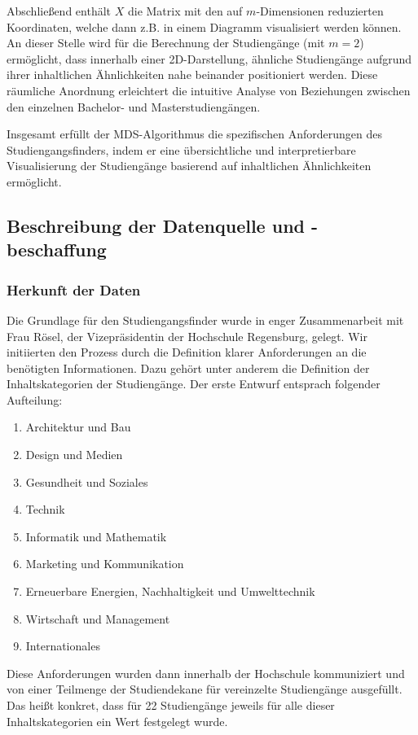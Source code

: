 Abschließend enthält $ X $ die Matrix mit den auf $ m $-Dimensionen reduzierten
Koordinaten, welche dann z.B. in einem Diagramm visualisiert werden können.
An dieser Stelle wird für die Berechnung der Studiengänge (mit $ m = 2 $)
ermöglicht, dass innerhalb einer 2D-Darstellung, ähnliche Studiengänge aufgrund
ihrer inhaltlichen Ähnlichkeiten nahe beinander positioniert werden. Diese
räumliche Anordnung erleichtert die intuitive Analyse von Beziehungen zwischen
den einzelnen Bachelor- und Masterstudiengängen.

Insgesamt erfüllt der MDS-Algorithmus die spezifischen Anforderungen des
Studiengangsfinders, indem er eine übersichtliche und interpretierbare
Visualisierung der Studiengänge basierend auf inhaltlichen Ähnlichkeiten
ermöglicht.

\subsection{Beschreibung der Datenquelle und -beschaffung}
\subsubsection{Herkunft der Daten}\label{sec:herkunft-der-daten}
Die Grundlage für den Studiengangsfinder wurde in enger Zusammenarbeit mit Frau
Rösel, der Vizepräsidentin der Hochschule Regensburg, gelegt. Wir initiierten
den Prozess durch die Definition klarer Anforderungen an die benötigten
Informationen. Dazu gehört unter anderem die Definition der Inhaltskategorien
der Studiengänge. Der erste Entwurf entsprach folgender Aufteilung:

\begin{enumerate}
    \item Architektur und Bau
    \item Design und Medien
    \item Gesundheit und Soziales
    \item Technik
    \item Informatik und Mathematik
    \item Marketing und Kommunikation
    \item Erneuerbare Energien, Nachhaltigkeit und Umwelttechnik
    \item Wirtschaft und Management
    \item Internationales
\end{enumerate}

Diese Anforderungen wurden dann innerhalb der Hochschule kommuniziert und von
einer Teilmenge der Studiendekane für vereinzelte Studiengänge ausgefüllt. Das
heißt konkret, dass für 22 Studiengänge jeweils für alle dieser
Inhaltskategorien ein Wert festgelegt wurde.

